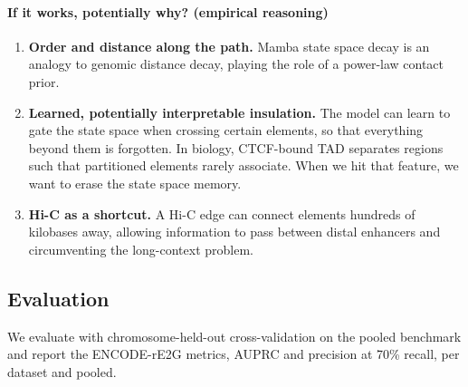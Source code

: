 \paragraph{If it works, potentially why? (empirical reasoning)}
\begin{enumerate}[nosep]
  \item \textbf{Order and distance along the path.} Mamba state space decay is an analogy to genomic distance decay, playing the role of a power-law contact prior.
  \item \textbf{Learned, potentially interpretable insulation.} The model can learn to gate the state space when crossing certain elements, so that everything beyond them is forgotten. In biology, CTCF-bound TAD separates regions such that partitioned elements rarely associate. When we hit that feature, we want to erase the state space memory.
  \item \textbf{Hi-C as a shortcut.} A Hi-C edge can connect elements hundreds of kilobases away, allowing information to pass between distal enhancers and circumventing the long-context problem.
\end{enumerate}

\subsection{Evaluation}
We evaluate with chromosome-held-out cross-validation on the pooled benchmark and report the ENCODE-rE2G metrics, AUPRC and precision at 70\% recall, per dataset and pooled.

